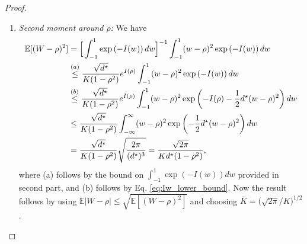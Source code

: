 \documentclass[12pt]{article}
\theoremstyle{definition}
\theoremstyle{remark}
\begin{document}
\begin{proof}
\begin{enumerate}
\begin{align*}
&= e^{-I(\rho)} \times \frac{1}{\sqrt{d^\star H_{\max}}} \int_{- (\hat \rho + \rho)\sqrt{d^\star H_{\max}} }^{(\hat \rho - \rho) \sqrt{d^\star H_{\max}}} \exp\left(-\frac{1}{2} u^2\right) du
\end{align*}
where we used the substitution $u = \sqrt{d^{\star} H_{\max}}(w-\rho)$. Here, we have that
\begin{align*}
    (\hat \rho - \rho) \sqrt{d^\star H_{\max}} = \Big( \max \Big\{ \rho , \frac{1}{\sqrt{d^\star}} \Big\} - \rho\Big) \sqrt{d^\star H_{\max}} \ge 0,
\end{align*}
and
\begin{align*}
    (\hat \rho + \rho) \sqrt{d^\star H_{\max}} &= \Big( \max \Big\{ \rho , \frac{1}{\sqrt{d^\star}} \Big\} + \rho\Big) \sqrt{d^\star H_{\max}} \geq \Big( 1 + \rho\sqrt{d^\star }\Big) \sqrt{\frac{1+\rho^2}{(1-\rho^2)^2}} \geq 1.
\end{align*}
Substituting these in the previous equation gives us that
\begin{align*}
    \int_{-1}^1 e^{-I(w)} dw &\ge e^{-I(\rho)} \times \frac{1}{\sqrt{d^\star H_{\max}}} \int_{-1}^{0} \exp\left(-\frac{1}{2} u^2\right) du\\
    &= e^{-I(\rho)} \frac{1-\rho^2}{\sqrt{d^\star(1+\rho^2)}} \int_{-1}^{0}\exp\left(-\frac{1}{2} u^2\right) du \geq \frac{K(1-\rho^2)}{\sqrt{d^\star}}e^{-I(\rho)},
\end{align*}
where we choose $K = \frac{1}{\sqrt{2}} \int_{-1}^{0}\exp\left(-\frac{1}{2} u^2\right) du$.

\item \textit{Second moment around $\rho$:} We have
\begin{align*}
    \mathbb{E}[(W-\rho)^2] &= \Big[ \int_{-1}^1 \exp \left( -I(w) \right) dw \Big]^{-1} \int_{-1}^1 (w-\rho)^2 \exp \left( -I(w)\right) dw \allowdisplaybreaks\\
    & \stackrel{(a)}{\leq} \frac{\sqrt{d^\star}}{K (1-\rho^2)} e^{I(\rho)} \int_{-1}^1 (w-\rho)^2 \exp \left( -I(w)\right) dw\allowdisplaybreaks\\
    & \stackrel{(b)}{\leq} \frac{\sqrt{d^\star}}{K (1-\rho^2)} e^{I(\rho)} \int_{-1}^1 (w-\rho)^2 \exp \left( -I(\rho) -\frac{1}{2} d^\star (w-\rho)^2\right) dw\allowdisplaybreaks\\
    & \leq \frac{\sqrt{d^\star}}{K (1-\rho^2)} \int_{-\infty}^\infty (w-\rho)^2 \exp \left( -\frac{1}{2} d^\star (w-\rho)^2\right) dw\allowdisplaybreaks\\
    & = \frac{\sqrt{d^\star}}{K (1-\rho^2)} \sqrt{\frac{2\pi}{(d^\star)^3}} = \frac{\sqrt{2\pi}}{K d^\star (1-\rho^2)},
\end{align*}
where (a) follows by the bound on $\int_{-1}^1 \exp \left( -I(w) \right) dw $ provided in second part, and (b) follows by Eq. \eqref{eq:Iw_lower_bound}. Now the result follows by using $\mathbb{E}|W-\rho| \leq \sqrt{\mathbb{E} [(W-\rho)^2]}$ and choosing $\bar K = \big( \sqrt{2\pi}/ K \big)^{1/2}$.
\end{enumerate}
\end{proof}
\end{document}
